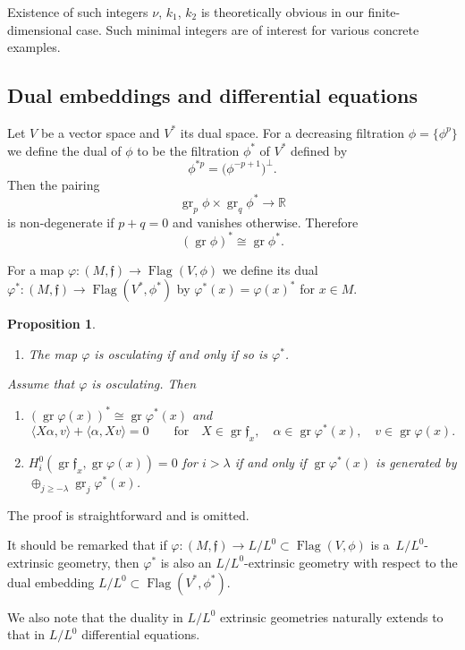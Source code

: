\documentclass[10pt,a4paper]{amsart}
\newcommand{\R}{\mathbb R}
\newcommand{\f}{\mathfrak f}
\newcommand{\Flag}{\operatorname{Flag}}
\newcommand{\gr}{\operatorname{gr}}
\newtheorem{prop}[thm]{Proposition}
\numberwithin{equation}{section}
\begin{document}
Existence of such integers $\nu$, $k_1$, $k_2$ is theoretically obvious in our finite-dimensional case. Such minimal integers are of interest for various concrete examples.

\subsection{Dual embeddings and differential equations}
Let $V$ be a vector space and $V^*$ its dual space. For a decreasing filtration $\phi=\{\phi^p\}$ we define the dual of $\phi$ to be the filtration $\phi^*$ of $V^*$ defined by
\[
\phi^{*p} = \big(\phi^{-p+1}\big)^\perp.
\]
Then the pairing
\[
\gr_p\phi \times \gr_q\phi^* \to \R
\]
is non-degenerate if $p+q=0$ and vanishes otherwise. Therefore
\[
(\gr\phi)^* \cong \gr\phi^*.
\]

For a map $\varphi\colon (M,\f) \to \Flag(V,\phi)$ we define its dual
$\varphi^*\colon (M,\f)\to \Flag(V^*,\phi^*)$ by $\varphi^*(x) = \varphi(x)^*$ for $x\in M$.

\begin{prop}\label{dual}\
	\begin{enumerate}\itemsep=0pt
		\item[$1.$] The map $\varphi$ is osculating if and only if so is $\varphi^*$.
	\end{enumerate}
 Assume that $\varphi$ is osculating. Then
 \begin{enumerate}\itemsep=0pt
 	\item[$2.$] $(\gr \varphi(x))^* \cong \gr\varphi^*(x)$ and
 	\[
 	 \langle X\alpha,v\rangle + \langle \alpha, Xv\rangle=0\qquad\text{for}\quad X\in\gr\f_x,\quad
 \alpha\in \gr\varphi^*(x),\quad v\in\gr\varphi(x).
 	\]
 	\item[$3.$] $H^0_i\left(\gr\f_x, \gr\varphi(x)\right)=0$ for $i>\lambda$ if and only if $\gr\varphi^*(x)$ is generated by $\oplus_{j\ge -\lambda} \gr_j\varphi^*(x)$.
 \end{enumerate}
\end{prop}
The proof is straightforward and is omitted.

It should be remarked that if $\varphi\colon (M,\f)\to L/L^0\subset \Flag(V,\phi)$ is a~$L/L^0$-extrinsic geometry, then $\varphi^*$ is also an $L/L^0$-extrinsic geometry with respect to the dual embedding $L/L^0\subset \Flag(V^*,\phi^*)$.

We also note that the duality in $L/ L^0$ extrinsic geometries naturally extends to that in $L/L^0$ differential equations.
\end{document}

